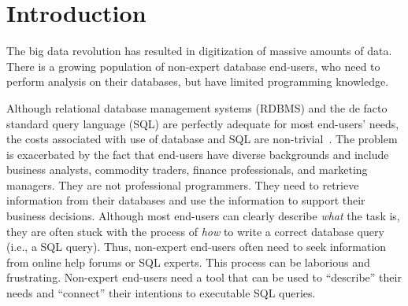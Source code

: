 \section{Introduction}
\label{sec:introduction}

\vspace{-1mm}

The big data revolution has resulted in digitization of massive amounts
of data. There is a growing population
of non-expert database end-users, who need to perform
analysis on their databases, but have limited programming knowledge.





Although relational database management systems (RDBMS) and the
de facto standard query language (SQL) are perfectly adequate for most end-users'
needs, 
the costs associated with use of database and SQL are non-trivial~\cite{Howe:2011}. 
The problem is exacerbated by the fact that end-users
have diverse backgrounds and include
business analysts, commodity traders, 
finance professionals, and marketing managers. 
They are not professional programmers.
They need to retrieve information from their
databases and use the information to support their business decisions.
Although most end-users can clearly describe \textit{what} the task is, they
are often stuck with the process of \textit{how} to
write a correct database query (i.e., a SQL query).
Thus, non-expert end-users often need to
seek information from online help forums or
SQL experts. This process can be laborious and frustrating.
Non-expert end-users need
a tool that can be used to ``describe''
their needs and ``connect'' their intentions to executable
SQL queries.


